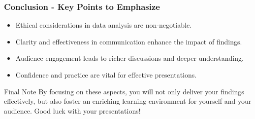 \documentclass[aspectratio=169]{beamer}
\begin{document}
\begin{frame}[fragile]
    \frametitle{Conclusion - Key Points to Emphasize}
    \begin{itemize}
        \item Ethical considerations in data analysis are non-negotiable.
        \item Clarity and effectiveness in communication enhance the impact of findings.
        \item Audience engagement leads to richer discussions and deeper understanding.
        \item Confidence and practice are vital for effective presentations.
    \end{itemize}
    \begin{block}{Final Note}
        By focusing on these aspects, you will not only deliver your findings effectively, 
        but also foster an enriching learning environment for yourself and your audience. 
        Good luck with your presentations!
    \end{block}
\end{frame}
\end{document}
